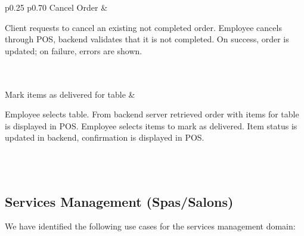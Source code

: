 \documentclass[]{VUMIFTemplateClass}
\begin{document}
\begin{longtable}{p{0.25\linewidth} p{0.70\linewidth}}
Cancel Order &
\begin{minipage}[t]{\linewidth}
Client requests to cancel an existing not completed order. Employee cancels through POS, backend validates that it is not completed. On success, order is updated; on failure, errors are shown.
\end{minipage} \\[6pt]
 \\[6pt]

Mark items as delivered for table &
\begin{minipage}[t]{\linewidth}
Employee selects table. From backend server retrieved order with items for table is displayed in POS. Employee selects items to mark as delivered. Item status is updated in backend, confirmation is displayed in POS.
\end{minipage} \\[6pt]
 \\[6pt]

\end{longtable}



\subsection{Services Management (Spas/Salons)}

%


We have identified the following use cases for the services management domain:
\end{document}
